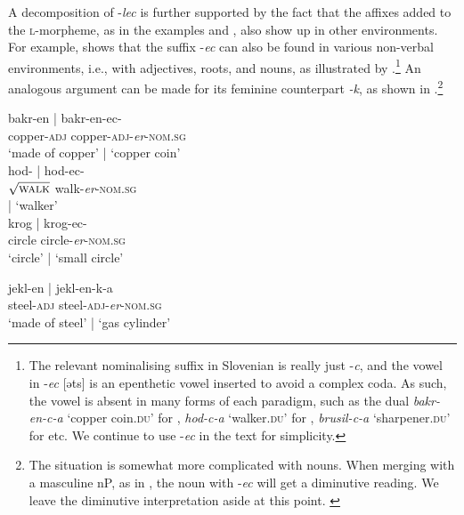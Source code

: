 \documentclass[output=paper,colorlinks,citecolor=brown]{langscibook}
\begin{document}
\largerpage
A decomposition of -\textit{lec} is  further supported by the fact that the affixes added to the \textsc{l}-morpheme, as in the examples  and , also show up in other environments. For example, \citet{marvin2002} shows that the suffix -\textit{ec} can also be found in various non-verbal environments, i.e., with adjectives, roots, and nouns, as illustrated by .\footnote{The relevant nominalising suffix in Slovenian is really just -\textit{c}, and the vowel in -\textit{ec} [əts] is an epenthetic vowel inserted to avoid a complex coda. As such, the vowel is absent in many forms of each paradigm, such as the dual \textit{bakr-en-c-a} `copper coin.\textsc{du}' for , \textit{hod-c-a} `walker.\textsc{du}' for , \textit{brusil-c-a} `sharpener.\textsc{du}' for  etc. We continue to use -\textit{ec} in the text for simplicity.\label{fn:epenthetic}} An analogous argument can be made for its feminine counterpart \textit{-k}, as shown in .\footnote{The situation is somewhat more complicated with nouns. When merging with a masculine nP, as in , the noun with -\textit{ec} will get a diminutive reading. We leave the diminutive interpretation aside at this point. \label{fn:diminutive}}


 \ea \label{ex: ec} \ea \label{ex:bakrenec}
\glll bakr-en | bakr-en-ec-\emptyset \\
copper-\textsc{adj}  {} copper-\textsc{adj}-\textit{er}-\textsc{nom.sg}\\ 
{`made of copper'}  | {`copper{ }coin'} \\

\ex \glll hod- %
| hod-ec-\emptyset \\ 
 $\sqrt{\textsc{walk}}$  {} walk-\textit{er}-\textsc{nom.sg} {} \\ 
{}  | `walker' \label{ex:drob}\\

\ex \glll krog %
| krog-ec-\emptyset \\ 
 circle {} circle-\textit{er}-\textsc{nom.sg} \\ 
`circle' | `small{ }circle'\label{ex:krogec}\\

\z \z 


\ea \label{ex:nka} \ea 
\glll jekl-en  %
| jekl-en-k-a \\
steel-\textsc{adj} {} steel-\textsc{adj}-\textit{er}-\textsc{nom.sg}\\ 
{`made of steel'}  | `gas{ }cylinder'\\
\end{document}
